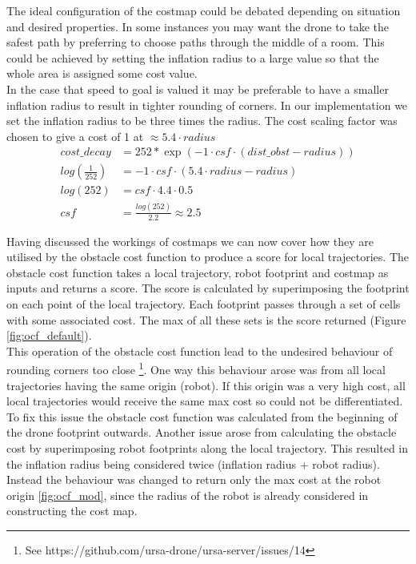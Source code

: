 \documentclass[capstone_report.tex]{subfiles}
\begin{document}
The ideal configuration of the costmap could be debated depending on situation and desired properties.  In some instances you may want the drone to take the safest path by preferring to choose paths through the middle of a room.  This could be achieved by setting the inflation radius to a large value so that the whole area is assigned some cost value. \\

In the case that speed to goal is valued it may be preferable to have a smaller inflation radius to result in tighter rounding of corners.  In our implementation we set the inflation radius to be three times the radius.  The cost scaling factor was chosen to give a cost of 1 at $\approx 5.4\cdot radius$
\begin{align*}
    cost\_decay &= 252*\exp(-1 \cdot csf \cdot (dist\_obst - radius))\\
    log(\frac{1}{252}) &= -1 \cdot csf \cdot (5.4\cdot radius - radius)\\
    log(252) &= csf \cdot 4.4\cdot0.5\\
    csf &=    \frac{log(252)}{2.2}
        \approx 2.5
\end{align*}


Having discussed the workings of costmaps we can now cover how they are utilised by the obstacle cost function to produce a score for local trajectories. The obstacle cost function takes a local trajectory, robot footprint and costmap as inputs and returns a score.  The score is calculated by superimposing the footprint on each point of the local trajectory.  Each footprint passes through a set of cells with some associated cost.  The max of all these sets is the score returned (Figure \ref{fig:ocf_default}). \\

This operation of the obstacle cost function lead to the undesired behaviour of rounding corners too close \footnote{See https://github.com/ursa-drone/ursa-server/issues/14}.  One way this behaviour arose was from all local trajectories having the same origin (robot). If this origin was a very high cost, all local trajectories would receive the same max cost so could not be differentiated.  To fix this issue the obstacle cost function was calculated from the beginning of the drone footprint outwards.  Another issue arose from calculating the  obstacle cost by superimposing robot footprints along the local trajectory.  This resulted in the inflation radius being considered twice (inflation radius + robot radius).  Instead the behaviour was changed to return only the max cost at the robot origin \ref{fig:ocf_mod}, since the radius of the robot is already considered in constructing the cost map.
\end{document}
